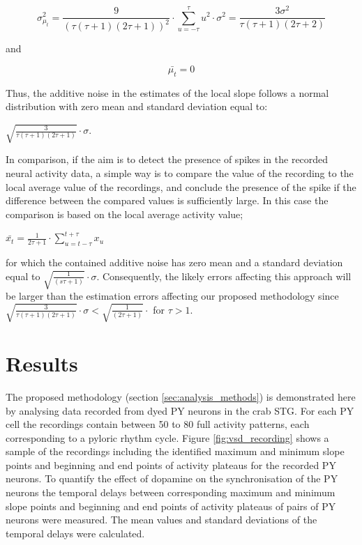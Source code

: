 \begin{equation}
\label{eq:thirteen}
\sigma_{\mu_{t}}^{2} = \frac{9}{(\tau(\tau+1)(2\tau+1))^2}\cdot \sum_{u=-\tau}^{\tau}u^{2} \cdot \sigma^{2} = \frac{3\sigma^{2}}{\tau(\tau+1)(2\tau+2)}
\end{equation}

and

\begin{equation}
\label{eq:fourteen}
\bar{\mu_{t}} = 0
\end{equation}

Thus, the additive noise in the estimates of the local slope follows a normal distribution with zero mean and standard deviation equal to:

$\sqrt{\frac{3}{\tau(\tau+1)(2\tau+1)}}\cdot\sigma$.

In comparison, if the aim is to detect the presence of spikes in the recorded neural activity data, a simple way is to compare the value of the recording to the local average value of the recordings, and conclude the presence of the spike if the difference between the compared values is sufficiently large. In this case the comparison is based on the local average activity value; 

$\bar{x_{t}} = \frac{1}{2\tau+1}\cdot\sum_{u=t-\tau}^{t+\tau}x_{u}$

for which the contained additive noise has zero mean and a standard deviation equal to $\sqrt{\frac{1}{(s\tau+1)}}\cdot\sigma$. Consequently, the likely errors affecting this approach will be larger than the estimation errors affecting our proposed methodology since $\sqrt{\frac{3}{\tau(\tau+1)(2\tau+1)}}\cdot\sigma<\sqrt{\frac{1}{(2\tau+1)}}\cdot$ for $\tau>1$.

\section{Results}
\label{subsec:application}

The proposed methodology (section \ref{sec:analysis_methods}) is demonstrated here by analysing data recorded from dyed \ac{PY} neurons in the crab \ac{STG}. For each \ac{PY} cell the recordings contain between 50 to 80 full activity patterns, each corresponding to a pyloric rhythm cycle. Figure \ref{fig:vsd_recording} shows a sample of the recordings including the identified maximum and minimum slope points and beginning and end points of activity plateaus for the recorded PY neurons. To quantify the effect of dopamine on the synchronisation of the \ac{PY} neurons the temporal delays between corresponding maximum and minimum slope points and beginning and end points of activity plateaus of pairs of \ac{PY} neurons were measured. The mean values and standard deviations of the temporal delays were calculated. 

